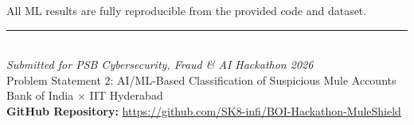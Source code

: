 \documentclass[11pt, a4paper]{article}
\begin{document}
\noindent All ML results are fully reproducible from the provided code and dataset.

\vspace{1cm}

\begin{center}
{\color{boiorange}\rule{0.6\textwidth}{1.5pt}}\\[10pt]
{\large\color{mainblue}\textit{Submitted for PSB Cybersecurity, Fraud \& AI Hackathon 2026}}\\[4pt]
{\normalsize\color{darkgrey} Problem Statement 2: AI/ML-Based Classification of Suspicious Mule Accounts}\\[4pt]
{\normalsize\color{darkgrey} Bank of India $\times$ IIT Hyderabad}\\[6pt]
{\small\color{mainblue}\textbf{GitHub Repository:} \url{https://github.com/SK8-infi/BOI-Hackathon-MuleShield}}
\end{center}
\end{document}
